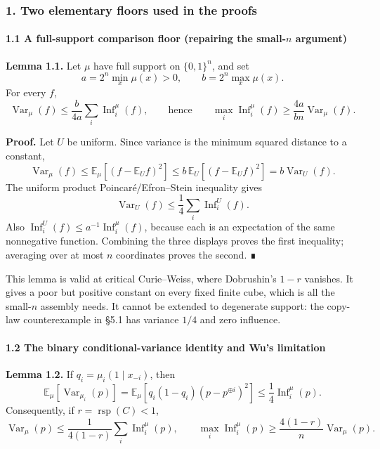 \subsubsection{1. Two elementary floors used in the proofs}\label{two-elementary-floors-used-in-the-proofs}

\paragraph{\texorpdfstring{1.1 A full-support comparison floor (repairing the small-\(n\) argument)}{1.1 A full-support comparison floor (repairing the small-n argument)}}\label{a-full-support-comparison-floor-repairing-the-small-n-argument}

\textbf{Lemma 1.1.} Let \(\mu\) have full support on \(\{0,1\}^n\), and set
\[a=2^n\min_x\mu(x)>0,\qquad b=2^n\max_x\mu(x).\]
For every \(f\),
\[\operatorname{Var}_\mu(f)\le\frac{b}{4a}\sum_i\operatorname{Inf}_i^\mu(f),
\qquad\text{hence}\qquad
\max_i\operatorname{Inf}_i^\mu(f)\ge\frac{4a}{bn}\operatorname{Var}_\mu(f).\]

\textbf{Proof.} Let \(U\) be uniform. Since variance is the minimum squared distance to a constant,
\[
\operatorname{Var}_\mu(f)
\le \mathbb E_\mu[(f-\mathbb E_Uf)^2]
\le b\,\mathbb E_U[(f-\mathbb E_Uf)^2]
=b\operatorname{Var}_U(f).
\]
The uniform product Poincaré/Efron--Stein inequality gives
\[\operatorname{Var}_U(f)\le\frac14\sum_i\operatorname{Inf}_i^U(f).\]
Also \(\operatorname{Inf}_i^U(f)\le a^{-1}\operatorname{Inf}_i^\mu(f)\), because each is an expectation of the same nonnegative function. Combining the three displays proves the first inequality; averaging over at most \(n\) coordinates proves the second. ∎

This lemma is valid at critical Curie--Weiss, where Dobrushin's \(1-r\) vanishes. It gives a poor but positive constant on every fixed finite cube, which is all the small-\(n\) assembly needs. It cannot be extended to degenerate support: the copy-law counterexample in §5.1 has variance \(1/4\) and zero influence.

\paragraph{1.2 The binary conditional-variance identity and Wu's limitation}\label{the-binary-conditional-variance-identity-and-wus-limitation}

\textbf{Lemma 1.2.} If \(q_i=\mu_i(1\mid x_{-i})\), then
\[\mathbb E_\mu[\operatorname{Var}_{\mu_i}(p)]
=\mathbb E_\mu[q_i(1-q_i)(p-p^{\oplus i})^2]
\le\frac14\operatorname{Inf}_i^\mu(p).\]
Consequently, if \(r=\operatorname{rsp}(C)<1\),
\[\operatorname{Var}_\mu(p)\le\frac{1}{4(1-r)}\sum_i\operatorname{Inf}_i^\mu(p),
\qquad
\max_i\operatorname{Inf}_i^\mu(p)\ge\frac{4(1-r)}n\operatorname{Var}_\mu(p).\]

